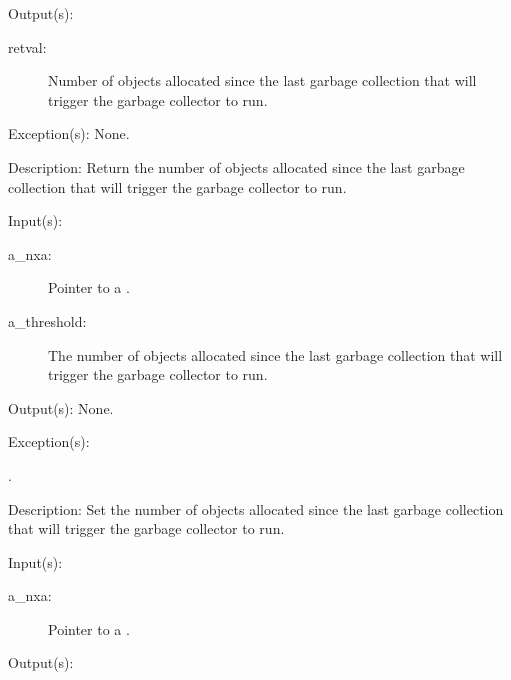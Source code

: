 \begin{capi}
\begin{capilist}
	\item[Output(s): ]
		\begin{description}\item[]
		\item[retval: ]
			Number of objects allocated since the last garbage
			collection that will trigger the garbage collector to
			run.
		\end{description}
	\item[Exception(s): ] None.
	\item[Description: ]
		Return the number of objects allocated since the last garbage
		collection that will trigger the garbage collector to run.
	\end{capilist}
\label{nxa_threshold_set}
	\begin{capilist}
	\item[Input(s): ]
		\begin{description}\item[]
		\item[a\_nxa: ]
			Pointer to a .
		\item[a\_threshold: ]
			The number of objects allocated since the last garbage
			collection that will trigger the garbage collector to
			run.
		\end{description}
	\item[Output(s): ] None.
	\item[Exception(s): ]
		\begin{description}\item[]
		\item[.]
		\end{description}
	\item[Description: ]
		Set the number of objects allocated since the last garbage
		collection that will trigger the garbage collector to run.
	\end{capilist}
\label{nxa_collections_get}
	\begin{capilist}
	\item[Input(s): ]
		\begin{description}\item[]
		\item[a\_nxa: ]
			Pointer to a \classname{nxa}.
		\end{description}
	\item[Output(s): ]

\end{capilist}
\end{capi}
